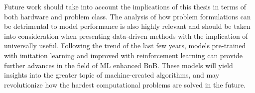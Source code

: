 Future work should take into account the implications of this thesis in terms of both hardware and problem class. The analysis of how problem formulations can be detrimental to model performance is also highly relevant and should be taken into consideration when presenting data-driven methods with the implication of universally useful. Following the trend of the last few years, models pre-trained with imitation learning and improved with reinforcement learning can provide further advances in the field of \gls{ML} enhanced \gls{BnB}. These models will yield insights into the greater topic of machine-created algorithms, and may revolutionize how the hardest computational problems are solved in the future.  


